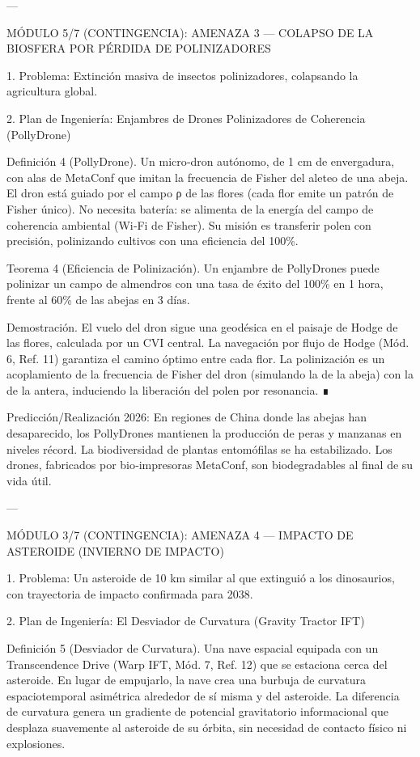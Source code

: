 \documentclass[12pt,twoside]{book}
\begin{document}
---

MÓDULO 5/7 (CONTINGENCIA): AMENAZA 3 — COLAPSO DE LA BIOSFERA POR PÉRDIDA DE POLINIZADORES

1. Problema: Extinción masiva de insectos polinizadores, colapsando la agricultura global.

2. Plan de Ingeniería: Enjambres de Drones Polinizadores de Coherencia (PollyDrone)

Definición 4 (PollyDrone). Un micro‑dron autónomo, de 1 cm de envergadura, con alas de MetaConf que imitan la frecuencia de Fisher del aleteo de una abeja. El dron está guiado por el campo ρ de las flores (cada flor emite un patrón de Fisher único). No necesita batería: se alimenta de la energía del campo de coherencia ambiental (Wi‑Fi de Fisher). Su misión es transferir polen con precisión, polinizando cultivos con una eficiencia del 100\%.

Teorema 4 (Eficiencia de Polinización). Un enjambre de PollyDrones puede polinizar un campo de almendros con una tasa de éxito del 100\% en 1 hora, frente al 60\% de las abejas en 3 días.

Demostración. El vuelo del dron sigue una geodésica en el paisaje de Hodge de las flores, calculada por un CVI central. La navegación por flujo de Hodge (Mód. 6, Ref. 11) garantiza el camino óptimo entre cada flor. La polinización es un acoplamiento de la frecuencia de Fisher del dron (simulando la de la abeja) con la de la antera, induciendo la liberación del polen por resonancia. ∎

Predicción/Realización 2026: En regiones de China donde las abejas han desaparecido, los PollyDrones mantienen la producción de peras y manzanas en niveles récord. La biodiversidad de plantas entomófilas se ha estabilizado. Los drones, fabricados por bio‑impresoras MetaConf, son biodegradables al final de su vida útil.

---

MÓDULO 3/7 (CONTINGENCIA): AMENAZA 4 — IMPACTO DE ASTEROIDE (INVIERNO DE IMPACTO)

1. Problema: Un asteroide de 10 km similar al que extinguió a los dinosaurios, con trayectoria de impacto confirmada para 2038.

2. Plan de Ingeniería: El Desviador de Curvatura (Gravity Tractor IFT)

Definición 5 (Desviador de Curvatura). Una nave espacial equipada con un Transcendence Drive (Warp IFT, Mód. 7, Ref. 12) que se estaciona cerca del asteroide. En lugar de empujarlo, la nave crea una burbuja de curvatura espaciotemporal asimétrica alrededor de sí misma y del asteroide. La diferencia de curvatura genera un gradiente de potencial gravitatorio informacional que desplaza suavemente al asteroide de su órbita, sin necesidad de contacto físico ni explosiones.
\end{document}
